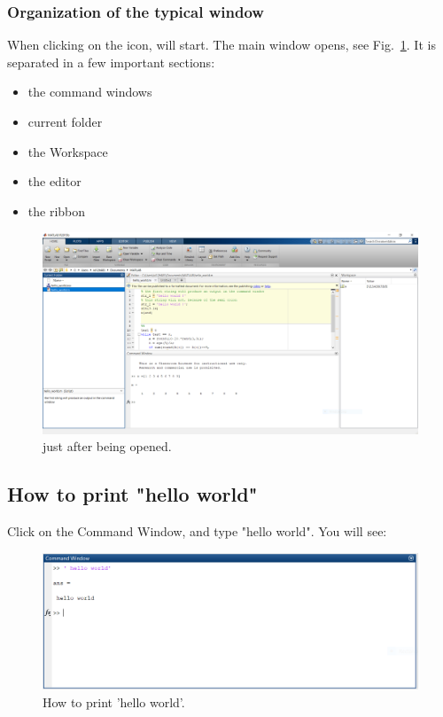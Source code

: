 		\subsubsection{Organization of the typical \matlab window}
		When clicking on the icon, \matlab will start. 
		The main window opens, see Fig.~\ref{fig-matlab}. It is separated in a few important sections:
		\begin{itemize}
			\item the command windows \\
			\item current folder \\
			\item the Workspace \\
			\item the editor \\
			\item the ribbon \\
		\end{itemize}

		\begin{figure}[h!]
			\center
			\includegraphics[width=0.95\linewidth]{./fig/matlab.PNG}
			\caption{
				\matlab just after being opened.
			}
			\label{fig-matlab}
		\end{figure}
	\subsection{How to print "hello world"}

		Click on the Command Window, and type "hello world".
		You will see:
		\begin{figure}[h!]
			\center
			\includegraphics[width=0.85\linewidth]{./fig/hello_world.PNG}
			\caption{
				How to print 'hello world'.
			}
			\label{fig-hellow_world}
		\end{figure}
		

